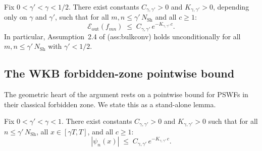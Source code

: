 \begin{theorem}
\label{thm:bridge}
Fix $0 < \gamma' < \gamma < 1/2$.
There exist constants $C_{\gamma,\gamma'} > 0$ and
$K_{\gamma,\gamma'} > 0$, depending only on $\gamma$ and $\gamma'$,
such that for all $m, n \le \gamma'\,N_{\mathrm{Sh}}$ and all
$c \ge 1$:
\begin{equation}
\label{eq:bridge:main}
  \mathcal{E}_{\mathrm{out}}(f_{mn})
  \;\le\;
  C_{\gamma,\gamma'}\,e^{-K_{\gamma,\gamma'}\,c}.
\end{equation}
In particular, Assumption~\textup{2.4} of \cite{PaperIII}
\textup{(ass:bulkconv)} holds unconditionally for all
$m, n \le \gamma'\,N_{\mathrm{Sh}}$ with $\gamma' < 1/2$.
\end{theorem}

\subsection{The WKB forbidden-zone pointwise bound}
\label{subsec:bridge-wkb}

The geometric heart of the argument rests on a pointwise bound for
PSWFs in their classical forbidden zone. We state this as a
stand-alone lemma.

\begin{lemma}
\label{lem:bridge:wkb}
Fix $0 < \gamma' < \gamma < 1$.
There exist constants $C_{\gamma,\gamma'} > 0$ and
$K_{\gamma,\gamma'} > 0$ such that for all
$n \le \gamma'\,N_{\mathrm{Sh}}$, all $x \in [\gamma T, T]$,
and all $c \ge 1$:
\begin{equation}
\label{eq:bridge:wkb}
  |\psi_n(x)|
  \;\le\;
  C_{\gamma,\gamma'}\,e^{-K_{\gamma,\gamma'}\,c}.
\end{equation}
\end{lemma}

